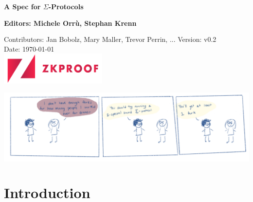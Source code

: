 \documentclass[11pt]{article}
\newcommand{\documentTitle}{A Spec for $\Sigma$-Protocols}
\begin{document}

\begin{titlepage}
   \begin{center}
       \vspace*{1cm}
       \textbf{\Huge{\documentTitle}}

       \vspace{2.0cm}
       \textbf{Editors: Michele Orrù, Stephan Krenn}

       \vspace{1.0cm}
			 Contributors: Jan Bobolz, Mary Maller, Trevor Perrin, ...
       \vfill
       Version: v0.2\\
       \vspace{0.5cm}
       Date: \today\\
       \vspace{1.3cm}
       \includegraphics[width=0.4\textwidth]{zkproof.png}
   \end{center}
\end{titlepage}
\pagestyle{plain}%


{
  \hypersetup{hidelinks}
  \tableofcontents
}
\vfill
\begin{center}
  \includegraphics[width=.9\textwidth]{Dinner_Party.png}
\end{center}

\clearpage
{}
\setcounter{page}{1}



\section{Introduction}
\end{document}
